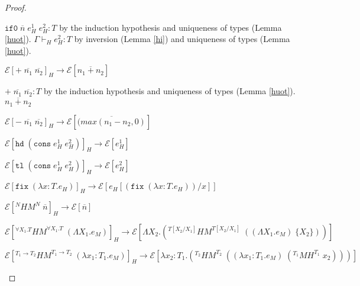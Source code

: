 \begin{hpn}
\begin{proof}
\begin{hpn-case-4}
$\mathtt{if0}\;\overline{n}\;e_{H}^{1}\;e_{H}^{2}:T$ by the induction hypothesis and uniqueness of types (Lemma \ref{huot}).  $\Gamma\vdash_{H}e_{H}^{2}:T$ by inversion (Lemma \ref{hi}) and uniqueness of types (Lemma \ref{huot}).
\end{hpn-case-4}
\begin{hpn-case-5}
$\mathscr{E}[+\;\overline{n_{1}}\;\overline{n_{2}}]_{H}\rightarrow\mathscr{E}[\overline{n_{1}+n_{2}}]$

$+\;\overline{n_{1}}\;\overline{n_{2}}:T$ by the induction hypothesis and uniqueness of types (Lemma \ref{huot}).  $\overline{n_{1}+n_{2}}$
\end{hpn-case-5}
\begin{hpn-case-6}
$\mathscr{E}[-\;\overline{n_{1}}\;\overline{n_{2}}]_{H}\rightarrow\mathscr{E}[\overline{(max(n_{1}-n_{2},0)}]$

\end{hpn-case-6}
\begin{hpn-case-7}
$\mathscr{E}[\mathtt{hd}\;(\mathtt{cons}\;e_{H}^{1}\;e_{H}^{2})]_{H}\rightarrow\mathscr{E}[e_{H}^{1}]$

\end{hpn-case-7}
\begin{hpn-case-8}
$\mathscr{E}[\mathtt{tl}\;(\mathtt{cons}\;e_{H}^{1}\;e_{H}^{2})]_{H}\rightarrow\mathscr{E}[e_{H}^{2}]$

\end{hpn-case-8}
\begin{hpn-case-9}
$\mathscr{E}[\mathtt{fix}\;(\lambda x:T.e_{H})]_{H}\rightarrow\mathscr{E}[e_{H}[(\mathtt{fix}\;(\lambda x:T.e_{H}))/x]]$

\end{hpn-case-9}
\begin{hpn-case-10}
$\mathscr{E}[^{N}HM^{N}\;\overline{n}]_{H}\rightarrow\mathscr{E}[\overline{n}]$

\end{hpn-case-10}
\begin{hpn-case-11}
$\mathscr{E}[^{\forall X_{1}.T}HM^{\forall X_{1}.T}\;(\Lambda X_{1}.e_{M})]_{H}\rightarrow\mathscr{E}[\Lambda X_{2}.(^{T[X_{2}/X_{1}]}HM^{T[X_{2}/X_{1}]}\;((\Lambda X_{1}.e_{M})\;\lbrace X_{2}\rbrace))]$


\end{hpn-case-11}
\begin{hpn-case-12}
$\mathscr{E}[^{T_{1}\rightarrow T_{2}}HM^{T_{1}\rightarrow T_{2}}\;(\lambda x_{1}:T_{1}.e_{M})]_{H}\rightarrow\mathscr{E}[\lambda x_{2}:T_{1}.(^{T_{2}}HM^{T_{2}}\;((\lambda x_{1}:T_{1}.e_{M})\;(^{T_{1}}MH^{T_{1}}\;x_{2})))]$


\end{hpn-case-12}
\end{proof}
\end{hpn}
